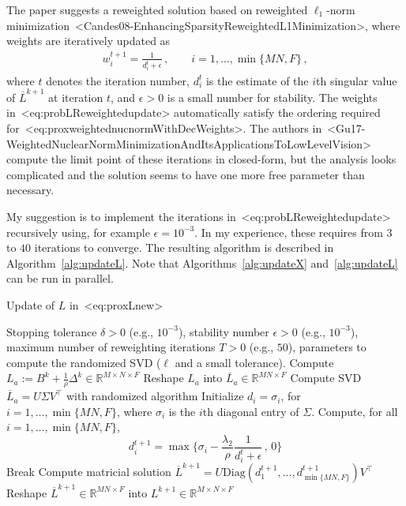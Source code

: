 \documentclass[a4paper,11pt]{article}
\def\cite#1{<#1>}%
\def\eqref#1{<#1>}%
\begin{document}
The paper suggests a reweighted solution based on reweighted $\ell_1$-norm
minimization~\cite{Candes08-EnhancingSparsityReweightedL1Minimization}, where
weights are iteratively updated as
\begin{align}
  \label{eq:probLReweightedupdate}
  w_i^{t+1} = \frac{1}{d_i^t + \epsilon}\,,\qquad
  i = 1, \ldots, \min\{MN, F\}\,,
\end{align}
where $t$ denotes the iteration number, $d_i^t$ is the estimate of
the $i$th singular value of $\overline{L}^{k+1}$ at iteration $t$, and $\epsilon > 0$ is a small number for
stability.
The weights in~\eqref{eq:probLReweightedupdate} automatically satisfy the
ordering required for~\eqref{eq:proxweightednucnormWithDecWeights}. 
The authors
in~\cite{Gu17-WeightedNuclearNormMinimizationAndItsApplicationsToLowLevelVision}
compute the limit point of these iterations in closed-form, but the analysis
looks complicated and the solution seems to have one more free parameter than
necessary. 

My suggestion is to implement the iterations
in~\eqref{eq:probLReweightedupdate} recursively using, for example $\epsilon =
10^{-3}$. In my experience, these requires from $3$ to $40$ iterations to
converge. The resulting algorithm is described in Algorithm~\ref{alg:updateL}.
Note that Algorithms~\ref{alg:updateX} and~\ref{alg:updateL} can be run in
parallel.

\begin{algorithm}
  \caption{Update of $L$ in~\eqref{eq:proxLnew}}
  \label{alg:updateL}
  \begin{algorithmic}[1]
  \algrenewcommand{}
  \Require Stopping tolerance $\delta > 0$ (e.g., $10^{-3}$), stability number $\epsilon > 0$ (e.g., $10^{-3}$), maximum number of
  reweighting iterations $T > 0$ (e.g., $50$), parameters to compute the
  randomized SVD ($\ell$ and a small tolerance).
  \State Compute $L_a := B^k + \frac{1}{\rho}\Delta^k \in \mathbb{R}^{M\times N\times F}$
  \State Reshape $L_a$ into $\overline{L}_a \in \mathbb{R}^{MN \times F}$
  \State Compute SVD $\overline{L}_a = U \Sigma V^\top$ with randomized
  algorithm
  \State Initialize $d_i = \sigma_i$, for $i = 1, \ldots, \min\{MN, F\}$, where
  $\sigma_i$ is the $i$th diagonal entry of $\Sigma$.
    \State Compute, for all $i = 1, \ldots, \min\{MN, F\}$, 
    $$
    d_i^{t+1} = \max\Big\{\sigma_i - \frac{\lambda_2}{\rho}\frac{1}{d_i^t + \epsilon}\, ,\, 0\Big\}
    $$
      \State Break
    \EndIf
  \EndFor
  \State Compute matricial solution $\overline{L}^{k+1} = U
  \text{Diag}(d_1^{t+1}, \ldots, d_{\min\{MN, F\}}^{t+1}) V^\top$
  \State Reshape $\overline{L}^{k+1} \in \mathbb{R}^{MN \times F}$ into
  $L^{k+1} \in \mathbb{R}^{M\times N\times F}$
  \end{algorithmic}
\end{algorithm}
\end{document}
